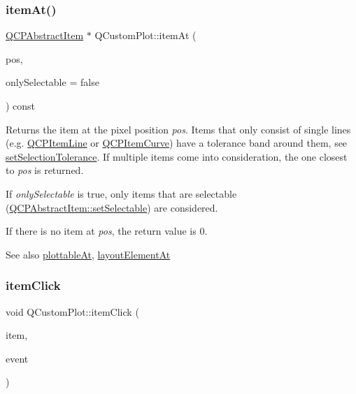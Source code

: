 \subsubsection{\texorpdfstring{item\+At()}{itemAt()}}
{\footnotesize\ttfamily \mbox{\hyperlink{class_q_c_p_abstract_item}{Q\+C\+P\+Abstract\+Item}} $\ast$ Q\+Custom\+Plot\+::item\+At (\begin{DoxyParamCaption}\item[{const Q\+PointF \&}]{pos,  }\item[{bool}]{only\+Selectable = {\ttfamily false} }\end{DoxyParamCaption}) const}

Returns the item at the pixel position {\itshape pos}. Items that only consist of single lines (e.\+g. \mbox{\hyperlink{class_q_c_p_item_line}{Q\+C\+P\+Item\+Line}} or \mbox{\hyperlink{class_q_c_p_item_curve}{Q\+C\+P\+Item\+Curve}}) have a tolerance band around them, see \mbox{\hyperlink{class_q_custom_plot_a4dc31241d7b09680950e19e5f971ed93}{set\+Selection\+Tolerance}}. If multiple items come into consideration, the one closest to {\itshape pos} is returned.

If {\itshape only\+Selectable} is true, only items that are selectable (\mbox{\hyperlink{class_q_c_p_abstract_item_a8a8e32a55bc478b849756a78c2d87fd2}{Q\+C\+P\+Abstract\+Item\+::set\+Selectable}}) are considered.

If there is no item at {\itshape pos}, the return value is 0.

\begin{DoxySeeAlso}{See also}
\mbox{\hyperlink{class_q_custom_plot_acddbbd8b16dd633f0d94e5a736fbd8cf}{plottable\+At}}, \mbox{\hyperlink{class_q_custom_plot_afaa1d304e0287d140fd238e90889ef3c}{layout\+Element\+At}} 
\end{DoxySeeAlso}
\mbox{\label{class_q_custom_plot_ae16b51f52d2b7aebbc7e3e74e6ff2e4b}} 
\subsubsection{\texorpdfstring{item\+Click}{itemClick}}
{\footnotesize\ttfamily void Q\+Custom\+Plot\+::item\+Click (\begin{DoxyParamCaption}\item[{\mbox{\hyperlink{class_q_c_p_abstract_item}{Q\+C\+P\+Abstract\+Item}} $\ast$}]{item,  }\item[{Q\+Mouse\+Event $\ast$}]{event }\end{DoxyParamCaption})\hspace{0.3cm}{\ttfamily [signal]}}

